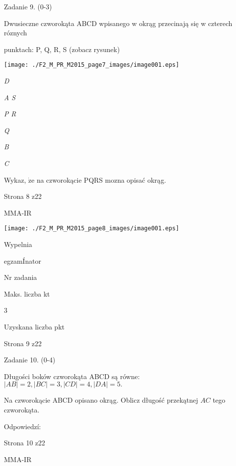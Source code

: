 \documentclass[a4paper,12pt]{article}
\begin{document}
Zadanie 9. (0-3)

Dwusieczne czworokąta ABCD wpisanego w okrąg przecinają się w czterech róznych

punktach: P, Q, R, S (zobacz rysunek)
\begin{center}
\texttt{[image: ./F2\_M\_PR\_M2015\_page7\_images/image001.eps]}
\end{center}
{\it D}

{\it A  S}

{\it P  R}

{\it Q}

{\it B}

{\it C}

Wykaz, $\dot{\mathrm{z}}\mathrm{e}$ na czworokącie PQRS mozna opisać okrąg.

Strona 8 z22

MMA-IR




\begin{center}
\texttt{[image: ./F2\_M\_PR\_M2015\_page8\_images/image001.eps]}
\end{center}
Wypelnia

egzamÍnator

Nr zadania

Maks. liczba kt

3

Uzyskana liczba pkt

Strona 9 z22





Zadanie 10. (0-4)

Długości boków czworokąta ABCD są równe: $|AB|=2, |BC|=3, |CD|=4, |DA|=5.$

Na czworokącie ABCD opisano okrąg. Oblicz długość przekątnej $AC$ tego czworokąta.

Odpowiedzí:

Strona 10 z22

MMA-IR
\end{document}
